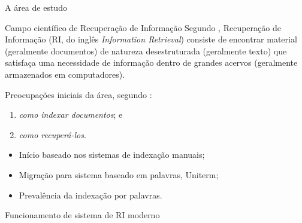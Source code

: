 \documentclass[%
  10pt,%
  aspectratio = 169,%
  compress,%
  t,%
]{beamer}%
\begin{document}
    \begin{frame}{}{A área de estudo}
        \begin{block}{Campo científico de Recuperação de Informação}
            Segundo \cite[p.~1]{Manning2008IIR}, Recuperação de Informação (RI, do inglês \textit{Information Retrieval}) consiste de encontrar material (geralmente documentos) de natureza desestruturada (geralmente texto) que satisfaça uma necessidade de informação dentro de grandes acervos (geralmente armazenados em computadores).
            \par
            Preocupações iniciais da área, segundo \cite[p.~3]{Sanderson2012THIRR}:
            \begin{enumerate}%
                \item \textit{como indexar documentos}; e
                \item \textit{como recuperá-los}.
            \end{enumerate}
        \end{block}
        \begin{itemize}
            \item Início baseado nos sistemas de indexação manuais;
            \item Migração para sistema baseado em palavras, Uniterm;
            \item Prevalência da indexação por palavras.
        \end{itemize}


    \end{frame}

    \begin{frame}[fragile = singleslide]{}{Funcionamento de sistema de RI moderno}%
    \end{frame}

\end{document}
